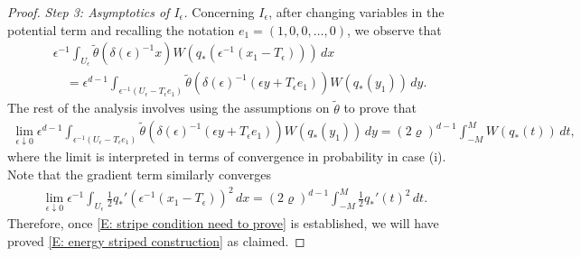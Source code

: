 \documentclass[10pt,a4paper]{amsart}
\begin{document}
\begin{proof}
	\textit{Step 3: Asymptotics of $I_{\epsilon}$.} Concerning $I_{\epsilon}$, after changing variables in the potential term and recalling the notation $e_{1} = (1,0,0,\dots,0)$, we observe that 
		\begin{align*}
			 &\epsilon^{-1} \int_{U_{\epsilon}} \tilde{\theta}(\delta(\epsilon)^{-1} x) W(q_* (\epsilon^{-1}(x_{1} - T_{\epsilon}))) \, dx \\
			 &\quad = \epsilon^{d-1} \int_{\epsilon^{-1} (U_{\epsilon} - T_{\epsilon} e_{1})} \tilde{\theta}(\delta(\epsilon)^{-1} (\epsilon y + T_{\epsilon} e_{1})) W(q_*(y_{1})) \, dy.
		\end{align*}
	The rest of the analysis involves using the assumptions on $\tilde{\theta}$ to prove that
		\begin{align} \label{E: stripe condition need to prove}
			\lim_{ \epsilon \downarrow 0 } \epsilon^{d-1} \int_{\epsilon^{-1} (U_{\epsilon} - T_{\epsilon} e_{1})} \tilde{\theta}(\delta(\epsilon)^{-1} (\epsilon y + T_{\epsilon} e_{1})) W(q_*(y_{1})) \, dy = (2\varrho)^{d-1} \int_{-M}^{M} W(q_{*}(t)) \, dt,
		\end{align}
	where the limit is interpreted in terms of convergence in probability in case (i).  Note that the gradient term similarly converges
		\begin{align*}
			\lim_{ \epsilon \downarrow 0 }\epsilon^{-1} \int_{U_{\epsilon}} \frac{1}{2} q_{*} '(\epsilon^{-1}(x_{1} - T_{\epsilon}))^{2} \, dx = (2\varrho)^{d-1} \int_{-M}^{M} \frac{1}{2} q_{*}'(t)^{2} \, dt.
		\end{align*}
	Therefore, once \eqref{E: stripe condition need to prove} is established, we will have proved \eqref{E: energy striped construction} as claimed.


\end{proof}
\end{document}
